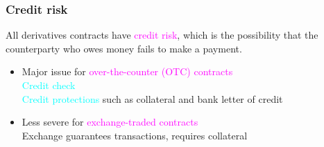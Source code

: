 \begin{frame}[fragile,t]
	\frametitle{Credit risk}

	All derivatives contracts have \textcolor{magenta}{credit risk}, which is the possibility that the
	counterparty who owes money fails to make a payment.  \bigskip

	\begin{itemize}
		\item Major issue for \textcolor{magenta}{over-the-counter (OTC) contracts}\\[1em]
			\textcolor{cyan}{Credit check} \\
			\textcolor{cyan}{Credit protections} such as collateral and bank letter of credit
		\bigskip
	\item Less severe for \textcolor{magenta}{exchange-traded contracts}\\[1em]
		Exchange guarantees transactions, requires collateral
	\end{itemize}
\end{frame}
